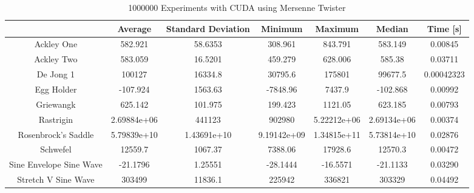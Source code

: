 \documentclass{article}
\begin{document}
	\begin{table}[h]
        \begin{centering}
            \begin{tabular}{|c||c|c|c|c|c|c|}
                \hline
                            & Average & Standard Deviation & Minimum & Maximum & Median & Time [s] \\
                \hline
                \hline
                Ackley One & 582.921 & 58.6353 & 308.961 & 843.791 & 583.149 & 0.00845 \\
                \hline
                Ackley Two & 583.059 & 16.5201 & 459.279 & 628.006 & 585.38 & 0.03711 \\
                \hline
                De Jong 1 & 100127 & 16334.8 & 30795.6 & 175801 & 99677.5 & 0.00042323\\
                \hline
                Egg Holder & -107.924 & 1563.63 & -7848.96 & 7437.9 & -102.868 & 0.00992 \\
                \hline
                Griewangk & 625.142 & 101.975 & 199.423 & 1121.05 & 623.185 & 0.00793 \\
                \hline
                Rastrigin & 2.69884e+06 & 441123 & 902980 & 5.22212e+06 & 2.69134e+06 & 0.00374 \\
                \hline
                Rosenbrock's Saddle & 5.79839e+10 & 1.43691e+10 & 9.19142e+09 & 1.34815e+11 & 5.73814e+10 & 0.02876 \\
                \hline
                Schwefel & 12559.7 & 1067.37 & 7388.06 & 17928.6 & 12570.3 & 0.00472\\
                \hline
                Sine Envelope Sine Wave & -21.1796 & 1.25551 & -28.1444 & -16.5571 & -21.1133 & 0.03290 \\
                \hline
                Stretch V Sine Wave & 303499 & 11836.1 & 225942 & 336821 & 303329 & 0.04492 \\
                \hline
            \end{tabular}
            \caption{1000000 Experiments with CUDA using Mersenne Twister}
        \end{centering}
        \end{table}
\end{document}

